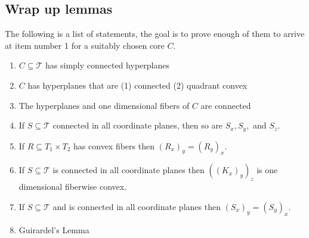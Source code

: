 \documentclass{article}
\newcommand{\sxyz}{((K_x)_y)_z}
\theoremstyle{mystyle}
\theoremstyle{remark}
\begin{document}
\subsection{Wrap up lemmas}
The following is a list of statements, the goal is to prove enough of them to arrive at item number 1 for a suitably chosen core \(C\).
\begin{enumerate}
    \item \(C \subseteq \mathscr{T}\) has simply connected hyperplanes
    \item \(C\) has hyperplanes that are (1) connected (2) quadrant convex
    \item The hyperplanes and one dimensional fibers of \(C\) are connected
    \item If \(S \subseteq \mathscr{T}\) connected in all coordinate planes, then so are \(S_{x}, S_{y},\) and \(S_{z}\).
    \item If \(R \subseteq T_{1} \times T_{2}\) has convex fibers then \( \left( R_{x} \right)_{y} = \left( R_{y} \right)_{x}\).
    \item If \(S \subseteq \mathscr{T}\) is connected in all coordinate planes then \(\sxyz\) is one dimensional fiberwise convex. 
    \item \label{state:7} If \(S \subseteq \mathscr{T}\) and is connected in all coordinate planes then \( \left( S_{x} \right)_{y} = \left( S_{y} \right)_{x}\).
    \item Guirardel's Lemma
\end{enumerate}
\end{document}
